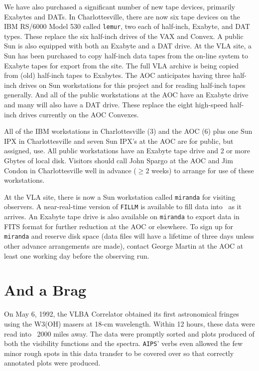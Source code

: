 We have also purchased a significant number of new tape devices,
primarily Exabytes and DATs.  In Charlottesville, there are now six
tape devices on the IBM RS/6000 Model 530 called {\tt lemur}, two each
of half-inch, Exabyte, and DAT types.  These replace the six half-inch
drives of the VAX and Convex.  A public Sun is also equipped with both
an Exabyte and a DAT drive.  At the VLA site, a Sun has been purchased
to copy half-inch data tapes from the on-line system to Exabyte tapes
for export from the site.  The full VLA archive is being copied from
(old) half-inch tapes to Exabytes.  The AOC anticipates having three
half-inch drives on Sun workstations for this project and for reading
half-inch tapes generally.  And all of the public workstations at the
AOC have an Exabyte drive and many will also have a DAT drive.  These
replace the eight high-speed half-inch drives currently on the AOC
Convexes.

All of the IBM workstations in Charlottesville (3) and the AOC (6)
plus one Sun IPX in Charlottesville and seven Sun IPX's at the AOC are
for public, but assigned, use.  All public workstations have an
Exabyte tape drive and 2 or more Gbytes of local disk.  Visitors
should call John Spargo at the AOC and Jim Condon in Charlottesville
well in advance ($\geq 2$ weeks) to arrange for use of these
workstations.

At the VLA site, there is now a Sun workstation called {\tt miranda}
for visiting observers.  A near-real-time version of {\tt FILLM} is
available to fill data into \AIPS\ as it arrives.  An Exabyte tape
drive is also available on {\tt miranda} to export data in FITS format
for further reduction at the AOC or elsewhere.  To sign up for {\tt
miranda} and reserve disk space (data files will have a lifetime of
three days unless other advance arrangements are made), contact George
Martin at the AOC at least one working day before the observing run.

\section{And a Brag}

On May 6, 1992, the VLBA Correlator obtained its first astronomical
fringes using the W3(OH) masers at 18-cm wavelength.  Within 12 hours,
these data were read into \AIPS\ 2000 miles away.  The data were
promptly sorted and plots produced of both the visibility functions
and the spectra.  {\tt AIPS}' verbs even allowed the few minor rough
spots in this data transfer to be covered over so that correctly
annotated plots were produced.



